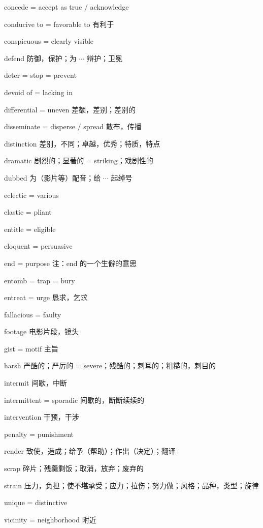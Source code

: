 \documentclass[UTF8, fontset = none, zihao = -4, linespread = 1.1]{ctexart}
\begin{document}
\begin{multicols}{2}
concede = accept as true / acknowledge

conducive to = favorable to 有利于

conspicuous = clearly visible

defend 防御，保护；为 $\cdots$ 辩护；卫冕

deter = stop = prevent

devoid of = lacking in

differential = uneven 差额，差别；差别的

disseminate = disperse / spread 散布，传播

distinction 差别，不同；卓越，优秀；特质，特点

dramatic 剧烈的；显著的 = striking；戏剧性的

dubbed 为（影片等）配音；给 $\cdots$ 起绰号

eclectic = various

elastic = pliant

entitle = eligible

eloquent = persuasive

end = purpose 注：end 的一个生僻的意思

entomb = trap = bury

entreat = urge 恳求，乞求

fallacious = faulty

footage 电影片段，镜头

gist = motif 主旨

harsh 严酷的；严厉的 = severe；残酷的；刺耳的；粗糙的，刺目的

intermit 间歇，中断

intermittent = sporadic 间歇的，断断续续的

intervention 干预，干涉

penalty = punishment

render 致使，造成；给予（帮助）；作出（决定）；翻译

scrap 碎片；残羹剩饭；取消，放弃；废弃的

strain 压力，负担；使不堪承受；应力；拉伤；努力做；风格；品种，类型；旋律

unique = distinctive

vicinity = neighborhood 附近
\end{multicols}
\end{document}
